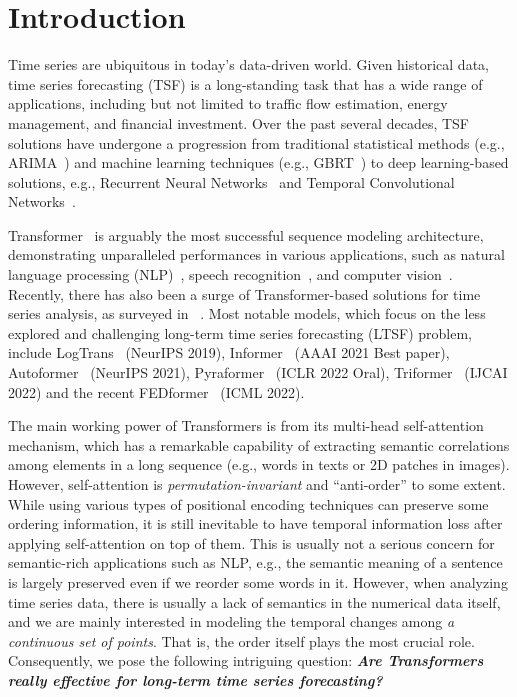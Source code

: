 \documentclass[10pt,twocolumn,letterpaper]{article}
\begin{document}
\section{Introduction}
\label{sec:intro}


Time series are ubiquitous in today's data-driven world. Given historical data, time series forecasting (TSF) is a long-standing task that
has a wide range of applications, including but not limited to traffic flow estimation, energy management, and financial investment.
Over the past several decades, TSF solutions have undergone a progression from traditional statistical methods (e.g., ARIMA~\cite{ariyo2014arima}) and machine learning techniques (e.g., GBRT~\cite{gbrt}) to deep learning-based solutions, e.g., Recurrent Neural Networks~\cite{GuokunLai2017lstm} and Temporal Convolutional Networks~\cite{bai2018empirical,liu2021time}. 


Transformer~\cite{vaswani2017attention} is arguably the most successful sequence modeling architecture, demonstrating unparalleled performances in various applications, such as natural language processing (NLP)~\cite{devlin2018bert}, speech recognition~\cite{dong2018speech}, and computer vision~\cite{liu2021swin,zeng2022deciwatch}. 
Recently, there has also been a surge of Transformer-based solutions for time series analysis, as surveyed in ~\cite{wen2022transformers}. Most notable models, which focus on the less explored and challenging long-term time series forecasting (LTSF) problem, include LogTrans~\cite{li2019LogTrans} (NeurIPS 2019), Informer~\cite{informer} (AAAI 2021 Best paper), Autoformer~\cite{xu2021autoformer} (NeurIPS 2021), Pyraformer~\cite{liu2021pyraformer} (ICLR 2022 Oral), Triformer~\cite{cirstea2022triformer} (IJCAI 2022) and the recent FEDformer~\cite{zhou2022fedformer} (ICML 2022). 


The main working power of Transformers is from its multi-head self-attention mechanism, which has a remarkable capability of extracting semantic correlations among elements in a long sequence (e.g., words in texts or 2D patches in images). However, self-attention is \emph{permutation-invariant} and ``anti-order'' to some extent. While using various types of positional encoding techniques can preserve some ordering information, it is still inevitable to have temporal information loss after applying self-attention on top of them. This is usually not a serious concern for semantic-rich applications such as NLP, e.g., the semantic meaning of a sentence is largely preserved even if we reorder some words in it. However, when analyzing time series data, there is usually a lack of semantics in the numerical data itself, and we are mainly interested in modeling the temporal changes among \emph{a continuous set of points}. That is, the order itself plays the most crucial role. Consequently, we pose the following intriguing question: \textbf{\emph{Are Transformers really effective for long-term time series forecasting?}}
\end{document}
